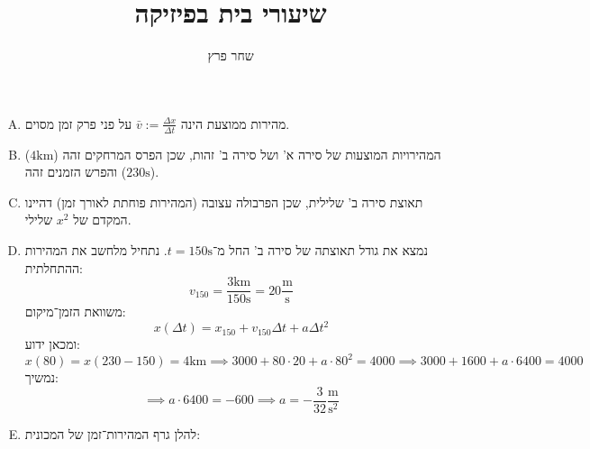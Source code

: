 \documentclass[]{../../../tex/classes/homework}
\author{שחר פרץ}
\title{שיעורי בית בפיזיקה}
\let\mrm \mathrm
\begin{document}
	\maketitle
	\section{}
	\begin{enumerate}[A.]
		\item מהירות ממוצעת הינה $\bar v := \frac{\Delta x}{\Delta t}$ על פני פרק זמן מסוים. 
		\item המהירויות המוצעות של סירה א' ושל סירה ב' זהות, שכן הפרס המרחקים זהה ($4\mathrm{km}$) והפרש הזמנים זהה ($230\mathrm{s}$). 
		\item תאוצת סירה ב' שלילית, שכן הפרבולה עצובה (המהירות פוחתת לאורך זמן) דהיינו המקדם של $x^{2}$ שלילי. 
		\item נמצא את גודל תאוצתה של סירה ב' החל מ־$t = 150\mrm{s}$. נתחיל מלחשב את המהירות ההתחלתית: 
		\[ v_{150} = \frac{3\mrm{km}}{150\mrm{s}} = 20\mrm{\frac{m}{s}} \]
		משוואת הזמן־מיקום: 
		\[ x(\Delta t) = x_{150} + v_{150}\Delta t + a\Delta t^{2} \]
		ומכאן ידוע: 
		\[ x(80) = x(230 - 150) = 4\mrm{km} \implies 3000 + 80 \cdot 20 + a \cdot 80^{2} = 4000 \implies 3000 + 1600 + a \cdot 6400 = 4000 \]
		נמשיך: 
		\[ \implies a \cdot 6400 = -600 \implies a = -\frac{3}{32}\mrm{\frac{m}{s^{2}}} \]
		\item להלן גרף המהירות־זמן של המכונית: 
		\sen
		\begin{center}
		\end{center}
		\she
	\end{enumerate}
	
\end{document}
